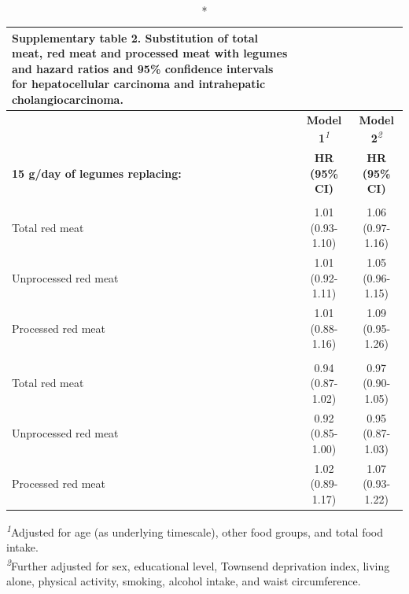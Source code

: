 \documentclass[sn-basic,Numbered,pdflatex]{sn-jnl}
\begin{document}
\begingroup
\setlength{}
\setlength{}\setlength{\LTpost}{0mm}
\begin{longtable}{@{\extracolsep{\fill}}lcc}
\caption*{
{\large \textbf{Supplementary table 2. Substitution of total meat, red meat and processed meat with legumes and hazard ratios and 95\% confidence intervals for hepatocellular carcinoma and intrahepatic cholangiocarcinoma.}}
} \\ 
\toprule
 & \textbf{Model 1}\textsuperscript{\textit{1}} & \textbf{Model 2}\textsuperscript{\textit{2}} \\ 
\cmidrule(lr){2-2} \cmidrule(lr){3-3}
\textbf{15 g/day of legumes replacing:} & \textbf{HR} \textbf{(95\% CI)} & \textbf{HR} \textbf{(95\% CI)} \\ 
\midrule\addlinespace[2.5pt]
\multicolumn{3}{l}{{\bfseries Hepatocellular carcinoma}} \\ 
\midrule\addlinespace[2.5pt]
Total red meat & 1.01 (0.93-1.10) & 1.06 (0.97-1.16) \\ 
Unprocessed red meat & 1.01 (0.92-1.11) & 1.05 (0.96-1.15) \\ 
Processed red meat & 1.01 (0.88-1.16) & 1.09 (0.95-1.26) \\ 
\midrule\addlinespace[2.5pt]
\multicolumn{3}{l}{{\bfseries Intrahepatic cholangiocarcinoma}} \\ 
\midrule\addlinespace[2.5pt]
Total red meat & 0.94 (0.87-1.02) & 0.97 (0.90-1.05) \\ 
Unprocessed red meat & 0.92 (0.85-1.00) & 0.95 (0.87-1.03) \\ 
Processed red meat & 1.02 (0.89-1.17) & 1.07 (0.93-1.22) \\ 
\bottomrule
\end{longtable}
\begin{minipage}{\linewidth}
\textsuperscript{\textit{1}}Adjusted for age (as underlying timescale), other food groups, and total food intake.\\
\textsuperscript{\textit{2}}Further adjusted for sex, educational level, Townsend deprivation index, living alone, physical activity, smoking, alcohol intake, and waist circumference.\\
\end{minipage}
\endgroup

\newpage
\end{document}
